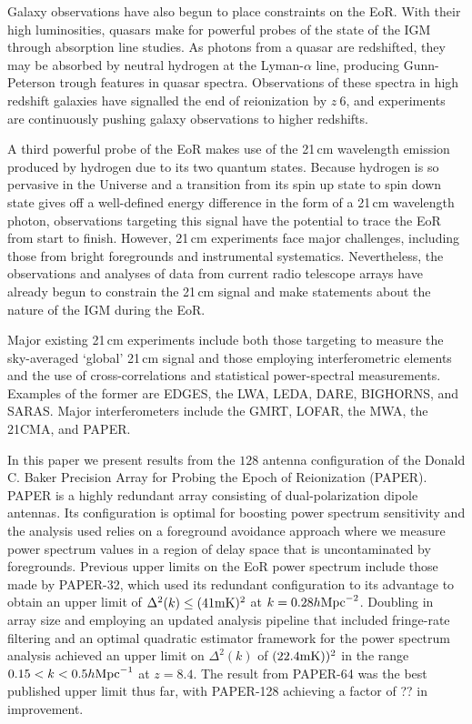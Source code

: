 \documentclass[preprint2,numberedappendix,tighten,twocolappendix]{aastex6}  %
\begin{document}
Galaxy observations have also begun to place constraints on the EoR. With their high luminosities, quasars make for powerful probes of the state of the IGM through absorption line studies. As photons from a quasar are redshifted, they may be absorbed by neutral hydrogen at the Lyman-$\alpha$ line, producing Gunn-Peterson trough features in quasar spectra. Observations of these spectra in high redshift galaxies have signalled the end of reionization by $z ~ 6$, and experiments are continuously pushing galaxy observations to higher redshifts. 

A third powerful probe of the EoR makes use of the 21\,cm wavelength emission produced by hydrogen due to its two quantum states. Because hydrogen is so pervasive in the Universe and a transition from its spin up state to spin down state gives off a  well-defined energy difference in the form of a 21\,cm wavelength photon, observations targeting this signal have the potential to trace the EoR from start to finish. However, 21\,cm experiments face major challenges, including those from bright foregrounds and instrumental systematics. Nevertheless, the observations and analyses of data from current radio telescope arrays have already begun to constrain the 21\,cm signal and make statements about the nature of the IGM during the EoR. 

Major existing 21\,cm experiments include both those targeting to measure the sky-averaged `global' 21\,cm signal and those employing interferometric elements and the use of cross-correlations and statistical power-spectral measurements. Examples of the former are EDGES, the LWA, LEDA, DARE, BIGHORNS, and SARAS. Major interferometers include the GMRT, LOFAR, the MWA, the 21CMA, and PAPER.

In this paper we present results from the $128$ antenna configuration of the Donald C. Baker Precision Array for Probing the Epoch of Reionization (PAPER). PAPER is a highly redundant array consisting of dual-polarization dipole antennas. Its configuration is optimal for boosting power spectrum sensitivity and the analysis used relies on a foreground avoidance approach where we measure power spectrum values in a region of delay space that is uncontaminated by foregrounds. Previous upper limits on the EoR power spectrum include those made by PAPER-32, which used its redundant configuration to its advantage to obtain an upper limit of $\Delta^{2}(k) \leq (41 {\rm mK})^{2}$ at $k=0.28h {\rm Mpc}^{-2}$. Doubling in array size and employing an updated analysis pipeline that included fringe-rate filtering and an optimal quadratic estimator framework for the power spectrum analysis achieved an upper limit on $\Delta^{2}(k)$ of $(22.4 {\rm mK}))^{2}$ in the range $0.15 < k < 0.5h {\rm Mpc}^{-1}$ at $z = 8.4$. The result from PAPER-64 was the best published upper limit thus far, with PAPER-128 achieving a factor of ?? in improvement.
\end{document}
